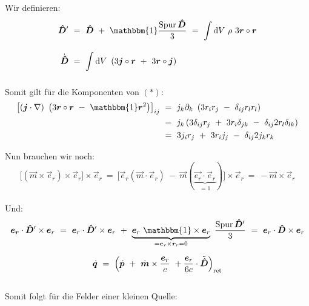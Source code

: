 \newpage
Wir definieren:
\begin{align*}
\tens{D}'  \ &= \ \tens{D} \ + \ \mathbbm{1}\frac{\operatorname{Spur} \tens{D}}{3}  \ = \  \Int{}{}{V}\rho \ 3 \vec{r}\circ\vec{r}\\
\dot{\tens{D}} \ &= \ \Int{}{}{V}\left(3\vec{j}\circ\vec{r} \ + \ 3 \vec{r}\circ\vec{j}\right)
\end{align*}

Somit gilt für die Komponenten von $(*)$:\\

\begin{align*}
\left[\left(\vec{j}\cdot\nabla\right) \ \left(3\vec{r}\circ\vec{r} \ - \ \mathbbm{1} \vec{r}^2\right)\right]_{ij}  \ &= \ j_k \partial_k\ \left(3 r_i r_j \ - \ \delta_{ij} r_l r_l\right)\\
&= \ j_k \left(3\delta_{ij}r_j \ + \ 3r_i\delta_{jk} \ - \ \delta_{ij} 2 r_l \delta_{lk}\right)\\
&= \ 3j_i r_j \ + \ 3 r_i j_j \ - \ \delta_{ij} 2 j_k r_k
\end{align*}

Nun brauchen wir noch:\\

\begin{equation*}
\big[\left(\vec{m}\times\vec{e}_r\right)\times\vec{e}_r\big]\times\vec{e}_r  \ = \ \big[\vec{e}_r(\vec{m}\cdot\vec{e}_r) \ - \ \vec{m}(\underbrace{\vec{e_r}\cdot\vec{e}_r}_{=1})\big] \times \vec{e}_r \ = \ - \vec{m}\times\vec{e}_r
\end{equation*}\\

Und:\\
\begin{equation*}
\vec{e_r}\cdot\tens{D}'\times\vec{e}_r  \ = \ \vec{e}_r \cdot\tens{D}'\times\vec{e}_r \ + \ \underbrace{\vec{e}_r \ \mathbbm{1} \times\vec{e}_r}_{=\vec{e}_r\times\vec{r}_r =0} \ \frac{\operatorname{Spur}\tens{D}'}{3}  \ = \ \vec{e}_r\cdot\tens{D}\times\vec{e}_r
\end{equation*}

\begin{equation*}
\dot{\bm{q}}  \ = \  \left(\dot{\bm{p}} \ + \ \dot{\bm{m}} \times\frac{\bm{e}_r}{c} \ + \frac{\bm{e}_r}{6c}\cdot \ddot{\bm{\hat{
D}}}\right)_{\text{ret}}
\end{equation*}\\

Somit folgt für die Felder einer kleinen Quelle:

